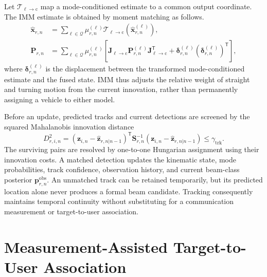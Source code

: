 Let \(\mathcal{T}_{\ell\rightarrow\mathrm{c}}\) map a mode-conditioned estimate
to a common output coordinate.  The IMM estimate is obtained by moment matching as follows.
\begin{align}
    \widehat{\mathbf{x}}_{r,n}
    &=
    \sum_{\ell\in\mathcal{Q}}
    \mu^{(\ell)}_{r,n}
    \mathcal{T}_{\ell\rightarrow\mathrm{c}}
    \left(\widehat{\mathbf{x}}^{(\ell)}_{r,n}\right),
    \label{eq:method-imm-fused-state}\\
    \mathbf{P}_{r,n}
    &=
    \sum_{\ell\in\mathcal{Q}}
    \mu^{(\ell)}_{r,n}
    \left[
    \mathbf{J}_{\ell\rightarrow\mathrm{c}}
    \mathbf{P}^{(\ell)}_{r,n}
    \mathbf{J}_{\ell\rightarrow\mathrm{c}}^{\mathsf T}
    +\boldsymbol{\delta}^{(\ell)}_{r,n}
    \left(\boldsymbol{\delta}^{(\ell)}_{r,n}\right)^{\mathsf T}
    \right],
    \label{eq:method-imm-fused-covariance}
\end{align}
where \(\boldsymbol{\delta}^{(\ell)}_{r,n}\) is the displacement between the
transformed mode-conditioned estimate and the fused state.  IMM thus adjusts the
relative weight of straight and turning motion from the current innovation,
rather than permanently assigning a vehicle to either model.

Before an update, predicted tracks and current detections are screened by the
squared Mahalanobis innovation distance
\begin{equation}
    D^2_{r,i,n}
    =
    \left(\mathbf{z}_{i,n}-\widehat{\mathbf{z}}_{r,n|n-1}\right)^{\mathsf T}
    \mathbf{S}^{-1}_{r,n}
    \left(\mathbf{z}_{i,n}-\widehat{\mathbf{z}}_{r,n|n-1}\right)
    \leq \gamma_{\mathrm{trk}}.
    \label{eq:method-track-gate}
\end{equation}
The surviving pairs are resolved by one-to-one Hungarian assignment using their
innovation costs.  A matched detection updates the kinematic state, mode
probabilities, track confidence, observation history, and current beam-class
posterior \(\mathbf{p}^{\mathrm{obs}}_{r,n}\).  An unmatched track can be
retained temporarily, but its predicted location alone never produces a formal
beam candidate.  Tracking consequently maintains temporal continuity without
substituting for a communication measurement or target-to-user association.

\section{Measurement-Assisted Target-to-User Association}
\label{sec:method-measurement-association}

